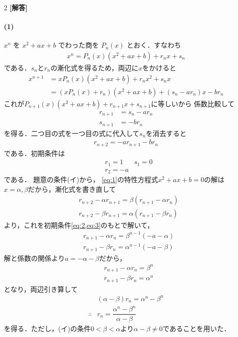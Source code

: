 \documentclass[../../main.tex]{subfiles}
\begin{document}
\setcounter{equation}{0}
\begin{oframed}
  
\end{oframed}
\setlength{\columnseprule}{0.4pt}
\begin{multicols}{2}
  {\bf [解答]}
  \paragraph{(1)}

  $x^n$ を $x^2+ax+b$ でわった商を $P_n(x)$ とおく．すなわち
  \begin{align}
    x^n = P_n(x)(x^2+ax+b) + r_n x + s_n
  \end{align}
  である．$s_n$と$r_n$の漸化式を得るため，両辺に$x$をかけると
  \begin{align}
    x^{n+1}
    & = x P_n(x) (x^2+ax+b) + r_n x^2 + s_n x                \\
    & = (x P_n(x) + r_n) (x^2+ax+b) + (s_n - ar_n) x - b r_n
  \end{align}
  これが$P_{n+1}(x)(x^2+ax+b) + r_{n+1} x + s_{n+1}$に等しいから
  係数比較して
  \begin{align}
    r_{n+1} & = s_n - ar_n \\
    s_{n+1} & = -b r_n
  \end{align}
  を得る．二つ目の式を一つ目の式に代入して$s_n$を消去すると
  \begin{align}
    r_{n+2} = -a r_{n+1} - b r_n \label{eq:1}
  \end{align}
  である．初期条件は
  \begin{align}
    & r_1 = 1                      & s_1 = 0 \label{eq:2} \\
    & r_2 = -a \label{eq:3}
  \end{align}
  である．
  題意の条件(イ)から，
  \cref{eq:1}の特性方程式$x^2+ax+b=0$の解は
  $x=\alpha,\beta$だから，漸化式を書き直して
  \begin{align}
    & r_{n+2} - \alpha r_{n+1} = \beta (r_{n+1}-\alpha r_{n}) \\
    & r_{n+2} - \beta  r_{n+1} = \alpha(r_{n+1}-\beta r_{n})
  \end{align}
  より，これを初期条件\cref{eq:2,eq:3}のもとで解いて，
  \begin{align}
    & r_{n+1} - \alpha r_{n} = \beta^{n-1}(-a-\alpha) \\
    & r_{n+1} - \beta r_{n} = \alpha^{n-1}(-a-\beta)
  \end{align}
  解と係数の関係より$a=-\alpha-\beta$だから，
  \begin{align}
    & r_{n+1} - \alpha r_{n} = \beta^{n} \\
    & r_{n+1} - \beta r_{n} = \alpha^{n}
  \end{align}
  となり，両辺引き算して
  \begin{align}
    & (\alpha - \beta) r_{n} = \alpha^n - \beta^n       \\
    \therefore
    & r_{n} = \dfrac{\alpha^n - \beta^n}{\alpha - \beta}
  \end{align}
  を得る．ただし，(イ)の条件$0 < \beta < \alpha$より$\alpha-\beta\neq 0$であることを用いた．


\end{multicols}
\end{document}
